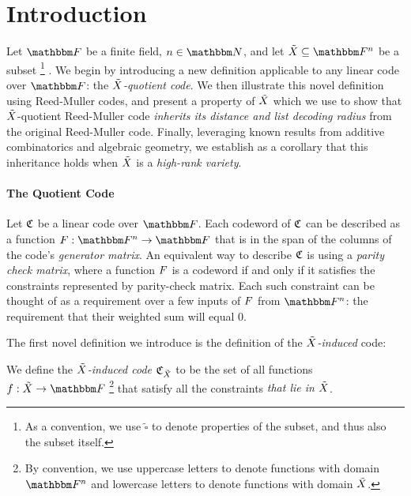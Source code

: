 \section{Introduction}\label{sec:introduction}
Let $\basefield$ be a finite field, $\blocklength \in \naturalnumbersset$, and let $\variety \subseteq \field$ be a subset
\footnote{As a convention, we use $\tilde{\square}$ to denote properties of the subset, and thus also the subset itself.}
.
We begin by introducing a new definition applicable to any linear code over $\basefield$: the \emph{${\tilde{X}}$-quotient code}.
We then illustrate this novel definition using Reed-Muller codes, and present a property of ${\tilde{X}}$ which we use to show that ${\tilde{X}}$-quotient Reed-Muller code \emph{inherits its distance and list decoding radius} from the original Reed-Muller code.
Finally, leveraging known results from additive combinatorics and algebraic geometry, we establish as a corollary that this inheritance holds when ${\tilde{X}}$ is a \emph{high-rank variety}.

\paragraph{The Quotient Code}
Let $\mathfrak{C}$ be a linear code over $\basefield$.
Each codeword of $\mathfrak{C}$ can be described as a function $\funcdef{\genfunc}{\field}{\basefield}$ that is in the span of the columns of the code's \emph{generator matrix}.
An equivalent way to describe $\mathfrak{C}$ is using a \emph{parity check matrix}, where a function $\genfunc$ is a codeword if and only if it satisfies the constraints represented by parity-check matrix.
Each such constraint can be thought of as a requirement over a few inputs of $\genfunc$ from $\field$: the requirement that their weighted sum will equal $0$.

The first novel definition we introduce is the definition of the \emph{${\tilde{X}}$-induced} code:
\begin{definition}
    We define the \emph{${\tilde{X}}$-induced code $\mathfrak{C}_{{\tilde{X}}}$} to be
    the set of all functions $\funcdef{\onvarfunc}{\variety}{\basefield}$
    \footnote{By convention, we use uppercase letters to denote functions with domain $\field$ and lowercase letters to denote functions with domain ${\tilde{X}}$.}
    that satisfy all the constraints \emph{that lie in ${\tilde{X}}$}.
\end{definition}

